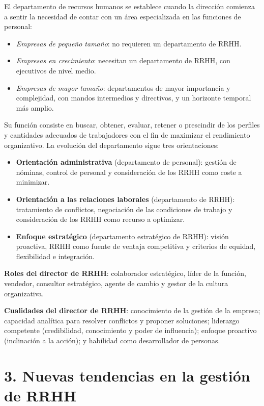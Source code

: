 \documentclass[12pt]{book} %
\providecommand{\tightlist}{%
  \setlength{\itemsep}{0pt}\setlength{\parskip}{0pt}}
\begin{document}
El departamento de recursos humanos se establece cuando la dirección
comienza a sentir la necesidad de contar con un área especializada en
las funciones de personal:

\begin{itemize}
\tightlist
\item
  \emph{Empresas de pequeño tamaño}: no requieren un departamento de
  RRHH.
\item
  \emph{Empresas en crecimiento}: necesitan un departamento de RRHH, con
  ejecutivos de nivel medio.
\item
  \emph{Empresas de mayor tamaño}: departamentos de mayor importancia y
  complejidad, con mandos intermedios y directivos, y un horizonte
  temporal más amplio.
\end{itemize}

Su función consiste en buscar, obtener, evaluar, retener o prescindir de
los perfiles y cantidades adecuados de trabajadores con el fin de
maximizar el rendimiento organizativo. La evolución del departamento
sigue tres orientaciones:

\begin{itemize}
\tightlist
\item
  \textbf{Orientación administrativa} (departamento de personal):
  gestión de nóminas, control de personal y consideración de los RRHH
  como coste a minimizar.
\item
  \textbf{Orientación a las relaciones laborales} (departamento de
  RRHH): tratamiento de conflictos, negociación de las condiciones de
  trabajo y consideración de los RRHH como recurso a optimizar.
\item
  \textbf{Enfoque estratégico} (departamento estratégico de RRHH):
  visión proactiva, RRHH como fuente de ventaja competitiva y criterios
  de equidad, flexibilidad e integración.
\end{itemize}

\textbf{Roles del director de RRHH}: colaborador estratégico, líder de
la función, vendedor, consultor estratégico, agente de cambio y gestor
de la cultura organizativa.

\textbf{Cualidades del director de RRHH}: conocimiento de la gestión de
la empresa; capacidad analítica para resolver conflictos y proponer
soluciones; liderazgo competente (credibilidad, conocimiento y poder de
influencia); enfoque proactivo (inclinación a la acción); y habilidad
como desarrollador de personas.

\hypertarget{nuevas-tendencias-en-la-gestiuxf3n-de-rrhh}{%
\section{3. Nuevas tendencias en la gestión de
RRHH}\label{nuevas-tendencias-en-la-gestiuxf3n-de-rrhh}}
\end{document}
